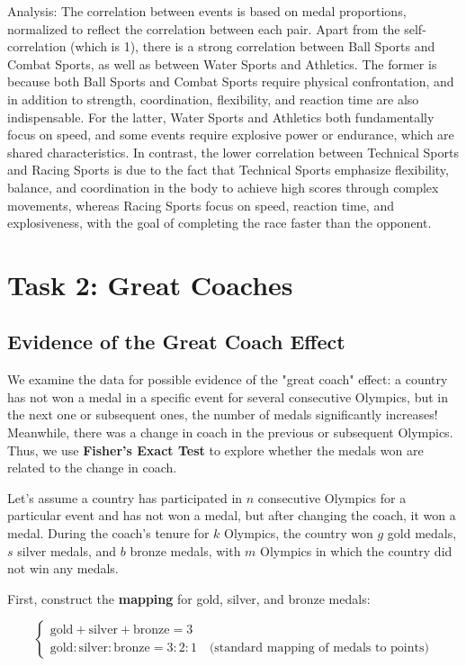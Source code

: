 \documentclass{mcmthesis}  %
\begin{document}
Analysis: The correlation between events is based on medal proportions, normalized to reflect the correlation between each pair. Apart from the self-correlation (which is 1), there is a strong correlation between Ball Sports and Combat Sports, as well as between Water Sports and Athletics. The former is because both Ball Sports and Combat Sports require physical confrontation, and in addition to strength, coordination, flexibility, and reaction time are also indispensable. For the latter, Water Sports and Athletics both fundamentally focus on speed, and some events require explosive power or endurance, which are shared characteristics. In contrast, the lower correlation between Technical Sports and Racing Sports is due to the fact that Technical Sports emphasize flexibility, balance, and coordination in the body to achieve high scores through complex movements, whereas Racing Sports focus on speed, reaction time, and explosiveness, with the goal of completing the race faster than the opponent.

\section{Task 2: Great Coaches}
\subsection{Evidence of the Great Coach Effect}

We examine the data for possible evidence of the "great coach" effect: a country has not won a medal in a specific event for several consecutive Olympics, but in the next one or subsequent ones, the number of medals significantly increases! Meanwhile, there was a change in coach in the previous or subsequent Olympics. Thus, we use \textbf{Fisher's Exact Test} to explore whether the medals won are related to the change in coach.

Let’s assume a country has participated in \(n\) consecutive Olympics for a particular event and has not won a medal, but after changing the coach, it won a medal. During the coach's tenure for \(k\) Olympics, the country won \(g\) gold medals, \(s\) silver medals, and \(b\) bronze medals, with \(m\) Olympics in which the country did not win any medals.

First, construct the \textbf{mapping} for gold, silver, and bronze medals:

\[
\begin{cases}
    \text{gold} + \text{silver} + \text{bronze} = 3 \\
    \text{gold} : \text{silver} : \text{bronze} = 3 : 2 : 1 \quad \text{(standard mapping of medals to points)}
\end{cases}
\]
\end{document}
